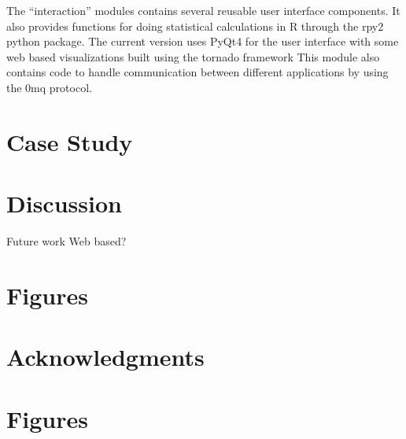 \documentclass[utf8]{frontiersSCNS} %
\begin{document}
The “interaction” modules contains several reusable user interface components. It also provides functions for doing statistical calculations in R\citep{team_r:_2012} through the rpy2 \citep{gautier_rpy2:_2008} python package. The current version uses PyQt4 for the user interface with some web based visualizations built using the tornado\citep{server_source_2008} framework  This module also contains code to handle communication between different applications by using the 0mq protocol\citep{hintjens_zeromq:_2013}.

\section{Case Study}

\section{Discussion}

Future work
Web based?
\section{Figures}

\section*{Acknowledgments}





\section*{Figures}
\end{document}

